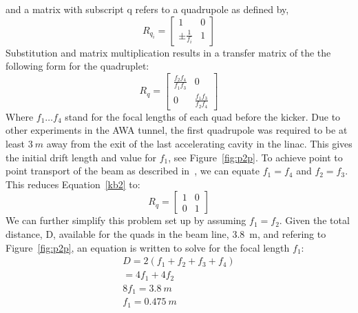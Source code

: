 and a matrix with subscript q refers to a quadrupole as defined by,
\begin{equation}
R_{q_i} = 
\begin{bmatrix}
1 & 0 \\
\pm \frac{1}{f_i} & 1
\end{bmatrix}
\end{equation}
Substitution and matrix multiplication results in a transfer matrix of the 
the following form for the quadruplet:
\begin{equation}
R_q = 
\begin{bmatrix}
\frac{f_2 f_4}{f_1 f_3} & 0 \\
0 & \frac{f_1 f_3}{f_2 f_4}	
\end{bmatrix}\label{kb2}
\end{equation}
Where $f_1 \ldots f_4$ stand for the focal lengths of each quad before the kicker. 
Due to other experiments in the AWA tunnel, 
the first quadrupole was required to be at least $\SI{3}{m}$ away from the exit of the 
last accelerating cavity in the linac. This gives the initial drift length and value
for $f_1$, see Figure~\ref{fig:p2p}.
To achieve point to point transport of the beam as described in~\cite{brown}, 
we can equate $f_1 = f_4$ and $f_2 = f_3$. This reduces Equation~\ref{kb2} to:
\begin{equation}
R_q =
\begin{bmatrix}
1 & 0 \\
0 & 1	
\end{bmatrix}
\end{equation}
We can further simplify this problem set up by 
assuming $f_1=f_2$. 
Given the total distance, D, available for the
quads in the beam line, \SI{3.8}{m}, and refering to Figure~\ref{fig:p2p}, 
an equation is written to solve for the focal length $f_1$: 
\begin{align}
D = 2 \left(f_1+f_2+f_3+f_4\right)\\
= 4f_1 + 4 f_2 \\
8f_1 = \SI{3.8}{m} \\
f_1 = \SI{0.475}{m}
\end{align}

